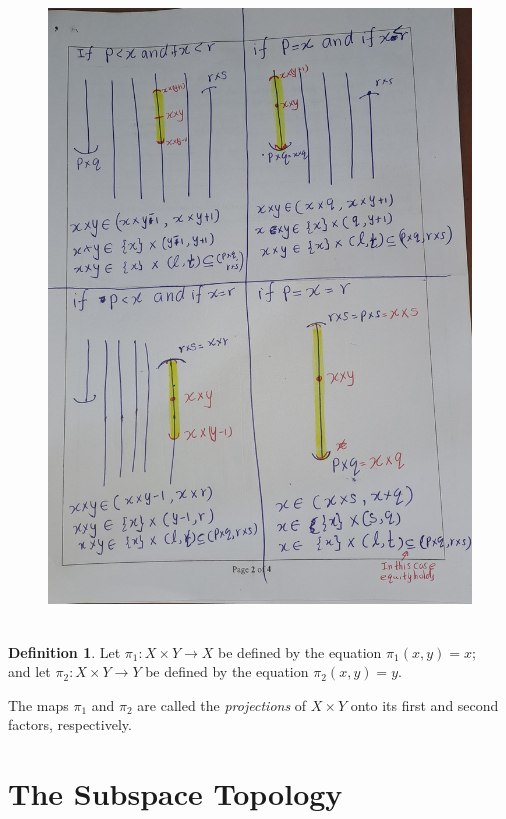 \documentclass[
]{book}
\theoremstyle{definition}
\newtheorem{definition}{Definition}[chapter]
\theoremstyle{definition}
\theoremstyle{definition}
\theoremstyle{definition}
\theoremstyle{remark}
\begin{document}
\begin{figure}
\centering
\includegraphics{figures/figure 12.jpg}
\caption{\label{fig:fig12}\(~\)}
\end{figure}

\begin{definition}
\protect\hypertarget{def:unnamed-chunk-42}{}\label{def:unnamed-chunk-42}Let \(\pi_1 : X \times Y \to X\) be defined by the equation
\(\pi_1(x, y) = x\);\\
and let \(\pi_2 : X \times Y \to Y\) be defined by the equation
\(\pi_2(x, y) = y\).

The maps \(\pi_1\) and \(\pi_2\) are called the \emph{projections} of \(X \times Y\) onto its first and second factors, respectively.
\end{definition}

\hypertarget{the-subspace-topology}{%
\section{The Subspace Topology}\label{the-subspace-topology}}
\end{document}
